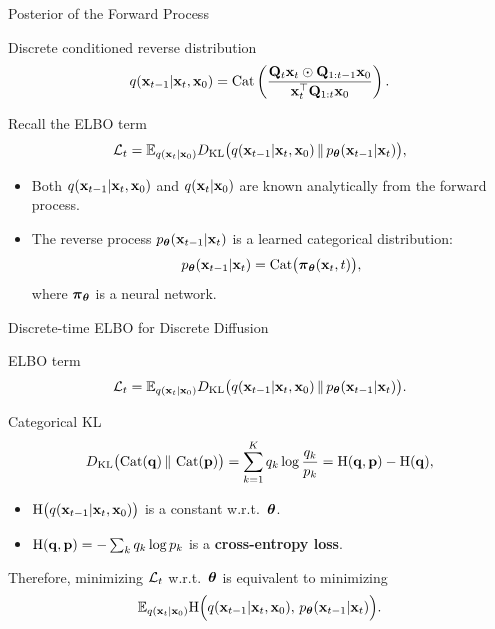 \documentclass{beamer}
\renewcommand{\eqpause}{}
\begin{document}
\begin{frame}{Posterior of the Forward Process}
	\begin{block}{Discrete conditioned reverse distribution}
		\[
			q(\mathbf{x}_{t-1} | \mathbf{x}_t, \mathbf{x}_0)
			= \operatorname{Cat}\left(\frac{\mathbf{Q}_t \mathbf{x}_t \odot \mathbf{Q}_{1:t-1} \mathbf{x}_0}{\mathbf{x}_t^{\top}\mathbf{Q}_{1:t}\mathbf{x}_0}\right).
		\]
		\vspace{-0.3cm}
	\end{block}
	\eqpause
	Recall the ELBO term
	\[
		\mathcal{L}_t
		= \mathbb{E}_{q(\mathbf{x}_t | \mathbf{x}_0)}
		D_\mathrm{KL}\bigl(q(\mathbf{x}_{t-1} | \mathbf{x}_t, \mathbf{x}_0) \,\|\, p_{\boldsymbol{\theta}}(\mathbf{x}_{t-1} | \mathbf{x}_t)\bigr),
	\]
	\eqpause
	\vspace{-0.5cm}
	\begin{itemize}
		\item Both $q(\mathbf{x}_{t-1} | \mathbf{x}_t, \mathbf{x}_0)$ and $q(\mathbf{x}_t | \mathbf{x}_0)$ are known analytically from the forward process.
		\item The reverse process $p_{\boldsymbol{\theta}}(\mathbf{x}_{t-1} | \mathbf{x}_t)$ is a learned categorical distribution:
		\[
			p_{\boldsymbol{\theta}}(\mathbf{x}_{t-1} | \mathbf{x}_t) = \operatorname{Cat}\bigl( \boldsymbol{\pi}_{\boldsymbol{\theta}}(\mathbf{x}_t, t) \bigr),
		\]
		where $\boldsymbol{\pi}_{\boldsymbol{\theta}}$ is a neural network.
	\end{itemize}
\end{frame}
\begin{frame}{Discrete-time ELBO for Discrete Diffusion}

	\begin{block}{ELBO term}
		\vspace{-0.3cm}
		\[
			\mathcal{L}_t
			= \mathbb{E}_{q(\mathbf{x}_t | \mathbf{x}_0)}
			D_\mathrm{KL}\bigl(q(\mathbf{x}_{t-1} | \mathbf{x}_t, \mathbf{x}_0) \,\|\, p_{\boldsymbol{\theta}}(\mathbf{x}_{t-1} | \mathbf{x}_t)\bigr).
		\]
		\vspace{-0.3cm}
	\end{block}
	\eqpause
	\begin{block}{Categorical KL}
		\vspace{-0.3cm}
		\[
			D_\mathrm{KL}\bigl(\operatorname{Cat}(\mathbf{q}) \,\|\, \operatorname{Cat}(\mathbf{p})\bigr)
			= \sum_{k=1}^K q_k \log \frac{q_k}{p_k}
			= \mathrm{H}(\mathbf{q},\mathbf{p}) - \mathrm{H}(\mathbf{q}),
		\]
		\eqpause
		\begin{itemize}
			\item $\mathrm{H}\bigl(q(\mathbf{x}_{t-1} | \mathbf{x}_t, \mathbf{x}_0)\bigr)$ is a constant w.r.t.~$\boldsymbol{\theta}$.
			\item $\mathrm{H}(\mathbf{q},\mathbf{p}) = -\sum_k q_k \log p_k$ is a \textbf{cross-entropy loss}.
		\end{itemize}
	\end{block}
	\eqpause
	Therefore, minimizing $\mathcal{L}_t$ w.r.t.~$\boldsymbol{\theta}$ is equivalent to minimizing
	\[
		\mathbb{E}_{q(\mathbf{x}_t | \mathbf{x}_0)}
		\mathrm{H}\Bigl(q(\mathbf{x}_{t-1} | \mathbf{x}_t, \mathbf{x}_0),\, p_{\boldsymbol{\theta}}(\mathbf{x}_{t-1} | \mathbf{x}_t)\Bigr).
	\]
\end{frame}
\end{document}
